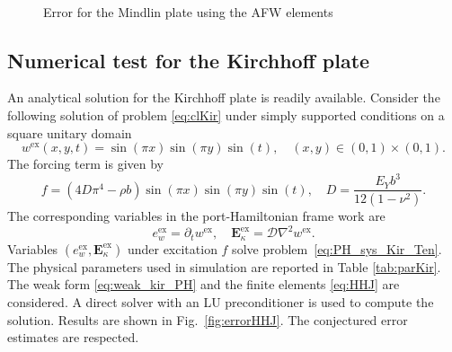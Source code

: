 \begin{figure}[ht]%
	\centering
	\hspace{8pt}%
	 \\
	\hspace{8pt}%
	\caption[errorAFW]{Error for the Mindlin plate using the AFW elements}%
	\label{fig:errorAFW}%
\end{figure}


\subsection{Numerical test for the Kirchhoff plate}
An analytical solution for the Kirchhoff plate is readily available. Consider the following solution of problem \eqref{eq:clKir} under simply supported conditions on a square unitary domain
\[
w^{\text{ex}}(x,y,t) = \sin(\pi x) \sin(\pi y) \sin(t), \quad  (x, y) \in (0,1)\times (0,1).
\] 
The forcing term is given by  
\[
f = (4 D \pi^4 - \rho b) \sin(\pi x) \sin(\pi y) \sin(t), \quad D = \frac{E_Y b^3}{12 (1-\nu^2)}.
\]
The corresponding variables in the port-Hamiltonian frame work are
\[
e_w^{\text{ex}} = \partial_t w^{\text{ex}}, \quad \bm{E}_\kappa^{\text{ex}} = \mathcal{D} \nabla^2 w^{\text{ex}}.
\]
Variables $(e_w^{\text{ex}}, \bm{E}_\kappa^{\text{ex}})$ under excitation $f$ solve problem~\eqref{eq:PH_sys_Kir_Ten}. The physical parameters used in simulation are reported in Table \ref{tab:parKir}. The weak form \eqref{eq:weak_kir_PH} and the finite elements \eqref{eq:HHJ} are considered. A direct solver with an LU preconditioner is used to compute the solution. Results are shown in Fig.~\ref{fig:errorHHJ}. The conjectured error estimates are respected.

